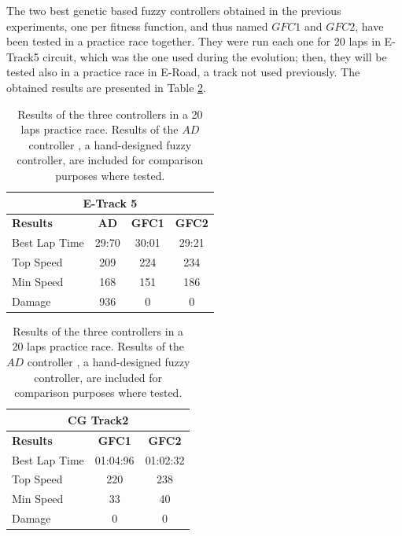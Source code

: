 \documentclass[sigconf]{acmart}
\begin{document}
The two best genetic based fuzzy controllers obtained in the previous
experiments, one per fitness function, and thus named $GFC1$ and
$GFC2$, have been tested
in a practice race together. They were run %
each one for 20 laps in E-Track5 circuit, which was the one used during the
evolution; then, they will be tested also in a practice race in
E-Road, a track not used previously. The obtained results are presented
in Table \ref{resultat20}. 

\begin{table}[!ht]
	\centering
	{\scriptsize
		\caption{Results of the three controllers in a 20 laps
			practice race. Results of the $AD$ controller
			\cite{evo17}, a hand-designed fuzzy controller, are
			included for comparison purposes where tested.}
		\label{resultat20}
		\begin{tabular}{|p{3cm}|c|c|c|}
			\hline
			\multicolumn{4}{|c|}{\textbf{E-Track 5}}  \\
			\hline \textbf{Results} & \textbf{AD} & \textbf{GFC1} & \textbf{GFC2}\\
			\hline Best Lap Time         & 29:70 & 30:01 & 29:21 \\
			\hline Top Speed          & 209 & 224 & 234\\
			\hline Min Speed          & 168 & 151 & 186 \\
			\hline Damage          & 936 & 0 & 0\\
			\hline
		\end{tabular}
		\begin{tabular}{|p{3cm}|c|c|}
			\hline
			\multicolumn{3}{|c|}{\textbf{CG Track2}}  \\ 
			\hline \textbf{Results} & \textbf{GFC1} & \textbf{GFC2}  \\
			\hline Best Lap Time         &       01:04:96     & 01:02:32  \\
			\hline Top Speed &220  &  238 \\
			\hline Min Speed               & 33             & 40  \\
			\hline Damage                    & 0              & 0  \\
			\hline 
		\end{tabular}
	}
\end{table} %
\end{document}
